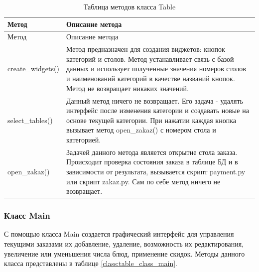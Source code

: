 \begin{xltabular}{\textwidth}{|p{6cm}|X|}
	\caption{Таблица методов класса Table\label{class:table_class_table}} \hline
	\centrow Метод & \centrow Описание метода \\ \hline
	\endfirsthead
	\centrow Метод & \centrow Описание метода \\ \hline
	\finishhead
	create\_widgets() & Метод предназначен для создания виджетов: кнопок категорий и столов. Метод устанавливает связь с базой данных и использует полученные значения номеров столов и наименований категорий в качестве названий кнопок. Метод не возвращает никаких значений. \\ \hline 
	select\_tables() & Данный метод ничего не возвращает. Его задача - удалять интерфейс после изменения категории и создавать новые на основе текущей категории. При нажатии каждая кнопка вызывает метод open\_zakaz() с номером стола и категорией. \\ \hline
	open\_zakaz() & Задачей данного метода является открытие стола заказа. Происходит проверка состояния заказа в таблице БД и в зависимости от результата, вызывается скрипт payment.py или скрипт zakaz.py. Сам по себе метод ничего не возвращает.
\end{xltabular}


\subsubsection{Класс Main}

С помощью класса Main создается графический интерфейс для управления текущими заказами их добавление, удаление, возможность их редактирования, увеличение или уменьшения числа блюд, применение скидок. Методы данного класса представлены в таблице \ref{class:table_class_main}.


